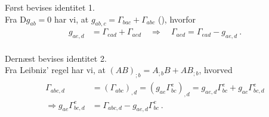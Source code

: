 \documentclass[../main.tex]{subfiles}
\begin{document}
Først bevises identitet 1.\\
Fra $\mathrm{D}g_{ab} = 0$ har vi, at $g_{ab,c} = \Gamma_{bac} + \Gamma_{abc}$ (\cite[fodnote 8]{ugeseddel3}), hvorfor
\begin{align}
    g_{ae,d} &= \Gamma_{ead} + \Gamma_{aed}
        \quad \Rightarrow \quad
    \Gamma_{aed} = \Gamma_{ead} - g_{ae,d} \: .
\end{align}
\\

Dernæst bevises identitet 2.\\
Fra Leibniz' regel har vi, at $(AB)_{;b} = A_{;b}B + AB_{;b}$, hvorved
\begin{align}
\begin{split}
    \Gamma_{abc,d} &= \left( \Gamma_{abc} \right)_{,d}
        = \left( g_{ae} \Gamma^e_{bc} \right)_{,d}
        = g_{ae,d} \Gamma^e_{bc} + g_{ae} \Gamma^e_{bc,d} \\
    \Rightarrow g_{ae} \Gamma^e_{bc,d} &= \Gamma_{abc,d} - g_{ae,d} \Gamma^e_{bc} \: .
\end{split}
\end{align}
\\
\end{document}
